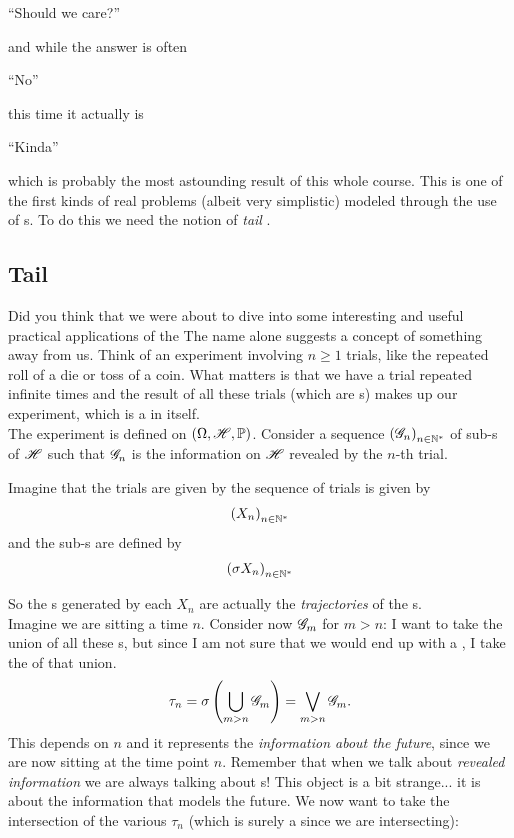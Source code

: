 \documentclass{report}
\begin{document}
\begin{center}
	``Should we care?''
\end{center}
and while the answer is often
\begin{center}
	``No''
\end{center}
this time it actually is 
\begin{center}
	``Kinda''
\end{center}
which is probably the most astounding result of this whole course. This is one of the first kinds of real problems (albeit very simplistic) modeled through the use of \rv s. To do this we need the notion of \textit{tail \sa}.
\subsection{Tail \sa}
Did you think that we were about to dive into some interesting and useful practical applications of the The name alone suggests a concept of something away from us. Think of an experiment involving $n\geq 1$ trials, like the repeated roll of a die or toss of a coin. What matters is that we have a trial repeated infinite times and the result of all these trials (which are \rv s) makes up our experiment, which is a \rv{} in itself. \\
The experiment is defined on $(\Omega,\mathscr{H},\mathbb{P})$. Consider a sequence ${(\mathscr{G}_n)}_{n\in\mathbb{N}^{*}}$ of sub-\sa s of $\mathscr{H}$ such that $\mathscr{G}_n$ is the information on $\mathscr{H}$ revealed by the $n$-th trial. 
\begin{example}
	Imagine that the trials are given by the sequence of trials is given by
	\[{(X_n)}_{n\in\mathbb{N}^{*}}\]
	and the sub-\sa s are defined by
	\[{(\sigma X_n)}_{n\in\mathbb{N}^{*}}\]
\end{example}
So the \sa s generated by each $X_n$ are actually the \textit{trajectories} of the \rv s.\\
Imagine we are sitting a time $n$. Consider now $\mathscr{G}_m$ for $m>n$: I want to take the union of all these \sa s, but since I am not sure that we would end up with a \sa, I take the \sa{} of that union.
\[\tau_n=\sigma\left(\bigcup_{m>n}\mathscr{G}_m\right)=\bigvee_{m>n}\mathscr{G}_m.\]
This \sa{} depends on $n$ and it represents the \textit{information about the future}, since we are now sitting at the time point $n$. Remember that when we talk about \textit{revealed information} we are always talking about \sa s!
This object is a bit strange... it is about the information that models the future. We now want to take the intersection of the various $\tau_n$ (which is surely a \sa{} since we are intersecting):
\end{document}
